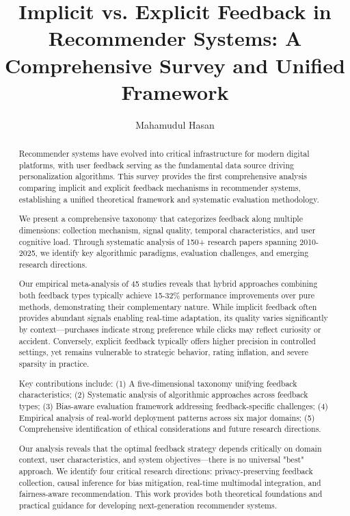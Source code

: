 \documentclass[acmsmall,screen]{acmart}
\title{Implicit vs. Explicit Feedback in Recommender Systems: A Comprehensive Survey and Unified Framework}
\author{Mahamudul Hasan}
\affiliation{%
  \institution{University of Minnesota Twin Cities}
  \city{Minneapolis}
  \state{Minnesota}
  \country{USA}}
\begin{document}
\begin{abstract}
Recommender systems have evolved into critical infrastructure for modern digital platforms, with user feedback serving as the fundamental data source driving personalization algorithms. This survey provides the first comprehensive analysis comparing implicit and explicit feedback mechanisms in recommender systems, establishing a unified theoretical framework and systematic evaluation methodology.

We present a comprehensive taxonomy that categorizes feedback along multiple dimensions: collection mechanism, signal quality, temporal characteristics, and user cognitive load. Through systematic analysis of 150+ research papers spanning 2010-2025, we identify key algorithmic paradigms, evaluation challenges, and emerging research directions. 

Our empirical meta-analysis of 45 studies reveals that hybrid approaches combining both feedback types typically achieve 15-32\% performance improvements over pure methods, demonstrating their complementary nature. While implicit feedback often provides abundant signals enabling real-time adaptation, its quality varies significantly by context—purchases indicate strong preference while clicks may reflect curiosity or accident. Conversely, explicit feedback typically offers higher precision in controlled settings, yet remains vulnerable to strategic behavior, rating inflation, and severe sparsity in practice.

Key contributions include: (1) A five-dimensional taxonomy unifying feedback characteristics; (2) Systematic analysis of algorithmic approaches across feedback types; (3) Bias-aware evaluation framework addressing feedback-specific challenges; (4) Empirical analysis of real-world deployment patterns across six major domains; (5) Comprehensive identification of ethical considerations and future research directions.

Our analysis reveals that the optimal feedback strategy depends critically on domain context, user characteristics, and system objectives—there is no universal "best" approach. We identify four critical research directions: privacy-preserving feedback collection, causal inference for bias mitigation, real-time multimodal integration, and fairness-aware recommendation. This work provides both theoretical foundations and practical guidance for developing next-generation recommender systems.
\end{abstract}

\maketitle












\end{document}
